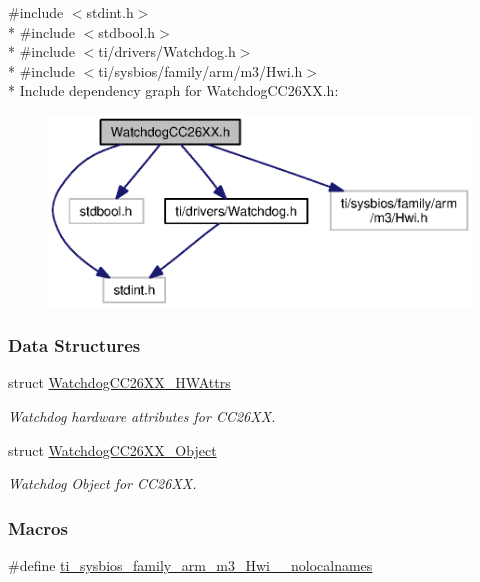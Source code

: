 {\ttfamily \#include $<$stdint.\+h$>$}\\*
{\ttfamily \#include $<$stdbool.\+h$>$}\\*
{\ttfamily \#include $<$ti/drivers/\+Watchdog.\+h$>$}\\*
{\ttfamily \#include $<$ti/sysbios/family/arm/m3/\+Hwi.\+h$>$}\\*
Include dependency graph for Watchdog\+C\+C26\+X\+X.\+h\+:
\nopagebreak
\begin{figure}[H]
\begin{center}
\leavevmode
\includegraphics[width=350pt]{_watchdog_c_c26_x_x_8h__incl}
\end{center}
\end{figure}
\subsubsection*{Data Structures}
\begin{DoxyCompactItemize}
\item 
struct \hyperlink{struct_watchdog_c_c26_x_x___h_w_attrs}{Watchdog\+C\+C26\+X\+X\+\_\+\+H\+W\+Attrs}
\begin{DoxyCompactList}\small\item\em Watchdog hardware attributes for C\+C26\+X\+X. \end{DoxyCompactList}\item 
struct \hyperlink{struct_watchdog_c_c26_x_x___object}{Watchdog\+C\+C26\+X\+X\+\_\+\+Object}
\begin{DoxyCompactList}\small\item\em Watchdog Object for C\+C26\+X\+X. \end{DoxyCompactList}\end{DoxyCompactItemize}
\subsubsection*{Macros}
\begin{DoxyCompactItemize}
\item 
\#define \hyperlink{_watchdog_c_c26_x_x_8h_aaa17ecf48f5762e2e1bdb0bab8aacf0c}{ti\+\_\+sysbios\+\_\+family\+\_\+arm\+\_\+m3\+\_\+\+Hwi\+\_\+\+\_\+nolocalnames}
\end{DoxyCompactItemize}
